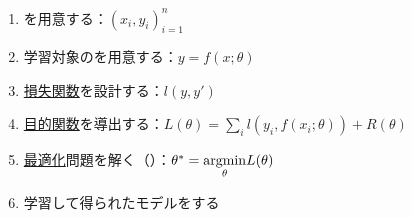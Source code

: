 \documentclass[../../../topic_machine-learning]{subfiles}
\begin{document}
\begin{enumerate}
  \item {}を用意する：$(x_i, y_i)_{i=1}^n$
  \item 学習対象のを用意する：$y = f(x;\theta)$
  \item \hyperref[chap:loss-function]{損失関数}を設計する：$l(y,y')$
  \item \hyperref[chap:objective-function]{目的関数}を導出する：$L(\theta) = \sum_i l(y_i, f(x_i;\theta)) + R(\theta)$
  \item \hyperref[chap:optimization-of-functions]{最適化}問題を解く（）：$\theta^* = \underset{\theta}{\operatorname{argmin}} L(\theta)$
  \item 学習して得られたモデルをする
\end{enumerate}

\end{document}
